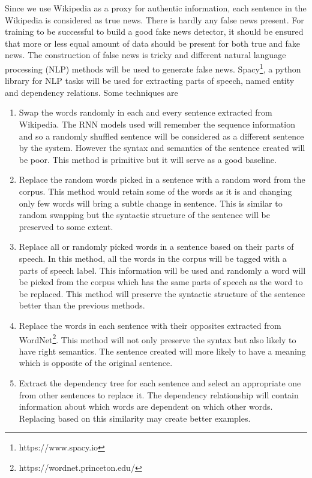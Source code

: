 \documentclass[a4paper, 11pt]{article}
\begin{document}
Since we use Wikipedia as a proxy for authentic information, each sentence in the Wikipedia is considered as true news. There is hardly any false news present. For training to be successful to build a good fake news detector, it should be ensured that more or less equal amount of data should be present for both true and fake news. The construction of false news is tricky and different natural language processing (NLP) methods will be used to generate false news. Spacy\footnote{https://www.spacy.io}, a python library for NLP tasks will be used for extracting parts of speech, named entity and dependency relations. Some techniques are 
\begin{enumerate}
\item Swap the words randomly in each and every sentence extracted from Wikipedia. The RNN models used will remember the sequence information and so a randomly shuffled sentence will be considered as a different sentence by the system. However the syntax and semantics of the sentence created will be poor. This method is primitive but it will serve as a good baseline. 
\item Replace the random words picked in a sentence with a random word from the corpus. This method would retain some of the words as it is and changing only few words will bring a subtle change in sentence. This is similar to random swapping but the syntactic structure of the sentence will be preserved to some extent.
\item Replace all or randomly picked words in a sentence based on their parts of speech. In this method, all the words in the corpus will be tagged with a parts of speech label. This information will be used and randomly a word will be picked from the corpus which has the same parts of speech as the word to be replaced. This method will preserve the syntactic structure of the sentence better than the previous methods. 
\item Replace the words in each sentence with their opposites extracted from WordNet\footnote{https://wordnet.princeton.edu/}. This method will not only preserve the syntax but also likely to have right semantics. The sentence created will more likely to have a meaning which is opposite of the original sentence. 
\item Extract the dependency tree for each sentence and select an appropriate one from other sentences to replace it. The dependency relationship will contain information about which words are dependent on which other words. Replacing based on this similarity may create better examples.
\end{enumerate}
\end{document}
